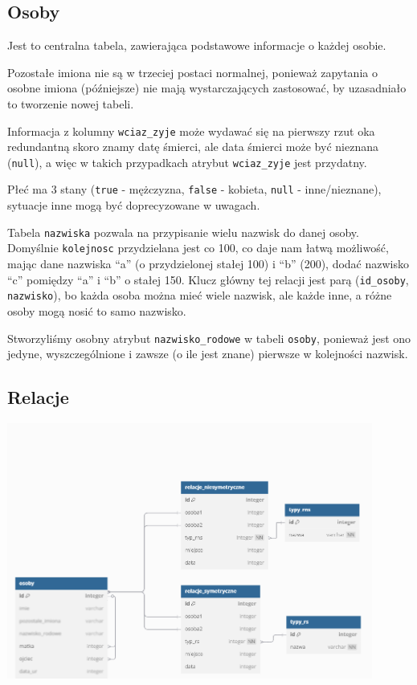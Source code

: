 \documentclass{article}
\begin{document}
\subsection{Osoby}
Jest to centralna tabela, zawierająca podstawowe informacje o każdej osobie.

Pozostałe imiona nie są w trzeciej postaci normalnej, ponieważ zapytania o osobne imiona (późniejsze) nie mają wystarczających zastosować, by uzasadniało to tworzenie nowej tabeli.

Informacja z kolumny \texttt{wciaz\_zyje} może wydawać się na pierwszy rzut oka redundantną skoro znamy datę śmierci, ale data śmierci może być nieznana (\texttt{null}), a więc w takich przypadkach atrybut \texttt{wciaz\_zyje} jest przydatny.

Płeć ma 3 stany (\texttt{true} - mężczyzna, \texttt{false} - kobieta, \texttt{null} - inne/nieznane), sytuacje inne mogą być doprecyzowane w uwagach.

Tabela \texttt{nazwiska} pozwala na przypisanie wielu nazwisk do danej osoby. Domyślnie \texttt{kolejnosc} przydzielana jest co 100, co daje nam łatwą możliwość, mając dane nazwiska “a” (o przydzielonej stałej 100) i “b” (200), dodać nazwisko “c” pomiędzy “a” i “b” o stałej 150. Klucz główny tej relacji jest parą (\texttt{id\_osoby}, \texttt{nazwisko}), bo każda osoba można mieć wiele nazwisk, ale każde inne, a różne osoby mogą nosić to samo nazwisko.

Stworzyliśmy osobny atrybut \texttt{nazwisko\_rodowe} w tabeli \texttt{osoby}, ponieważ jest ono jedyne, wyszczególnione i zawsze (o ile jest znane) pierwsze w kolejności nazwisk.

\subsection{Relacje}

\begin{center}
    \includegraphics[width=0.9\textwidth]{img/Database_plan_a}
\end{center}
\end{document}
